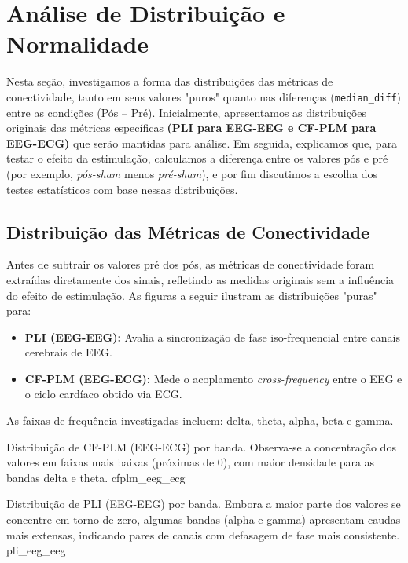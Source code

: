 \chapter{Análise de Distribuição e Normalidade}
\label{chap:analise_distribuicao_normalidade}

Nesta seção, investigamos a forma das distribuições das métricas de conectividade, tanto em seus valores "puros" quanto nas diferenças (\texttt{median\_diff}) entre as condições (Pós – Pré). Inicialmente, apresentamos as distribuições originais das métricas específicas \textbf{(PLI para EEG-EEG e CF-PLM para EEG-ECG)} que serão mantidas para análise. Em seguida, explicamos que, para testar o efeito da estimulação, calculamos a diferença entre os valores pós e pré (por exemplo, \emph{pós-sham} menos \emph{pré-sham}), e por fim discutimos a escolha dos testes estatísticos com base nessas distribuições.

\section{Distribuição das Métricas de Conectividade}

Antes de subtrair os valores pré dos pós, as métricas de conectividade foram extraídas diretamente dos sinais, refletindo as medidas originais sem a influência do efeito de estimulação. As figuras a seguir ilustram as distribuições "puras" para:

\begin{itemize}
    \item \textbf{PLI (EEG-EEG):} Avalia a sincronização de fase iso-frequencial entre canais cerebrais de EEG.
    \item \textbf{CF-PLM (EEG-ECG):} Mede o acoplamento \emph{cross-frequency} entre o EEG e o ciclo cardíaco obtido via ECG.
\end{itemize}

As faixas de frequência investigadas incluem: delta, theta, alpha, beta e gamma.

{Distribuição de CF-PLM (EEG-ECG) por banda. Observa-se a concentração dos valores em faixas mais baixas (próximas de 0), com maior densidade para as bandas delta e theta.}
{cfplm_eeg_ecg}


{Distribuição de PLI (EEG-EEG) por banda. Embora a maior parte dos valores se concentre em torno de zero, algumas bandas (alpha e gamma) apresentam caudas mais extensas, indicando pares de canais com defasagem de fase mais consistente.}
{pli_eeg_eeg}



